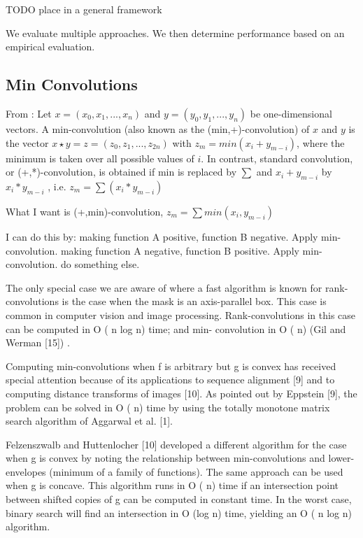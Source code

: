 TODO place in a general framework

We evaluate multiple approaches. We then determine performance based on an
empirical evaluation.

\subsection{Min Convolutions}
From \cite{burcsi2010table}:
Let $x = (x_0, x_1, ..., x_n)$ and $y = (y_0, y_1, ..., y_n)$ be one-dimensional
vectors.
A min-convolution (also known as the (min,+)-convolution) of $x$ and $y$ is the
vector $x \star y = z = (z_0, z_1, ...,z_{2n})$
with $z_m = min(x_i + y_{m-i})$, where the minimum is taken over all possible
values of $i$. 
In contrast, standard convolution, or (+,*)-convolution, is obtained if min is replaced by $\sum$ and
$x_i + y_{m-i}$ by $x_i * y_{m-i}$ , i.e. 
$z_m = \sum(x_i * y_{m-i})$

What I want is (+,min)-convolution, $z_m = \sum min(x_i , y_{m-i})$

I can do this by:
making function A positive, function B negative.
Apply min-convolution.
making function A negative, function B positive.
Apply min-convolution.
do something else.


The only special case we are aware of where a fast algorithm is known for
rank-convolutions is the case when the mask is an axis-parallel box. This case
is common in computer vision and image processing. Rank-convolutions in this
case can be computed in O ( n log n) time; and min- convolution in O ( n) (Gil
and Werman [15]) \cite{babai2009computing}.

Computing min-convolutions when f is arbitrary but g is convex has received
special attention because of its applications to sequence alignment [9] and to
computing distance transforms of images [10]. As pointed out by Eppstein [9],
the problem can be solved in O ( n) time by using the totally monotone matrix
search algorithm of Aggarwal et al. [1].
\cite{babai2009computing}

Felzenszwalb and Huttenlocher [10] developed a different algorithm for the case
when g is convex by noting the relationship between min-convolutions and
lower-envelopes (minimum of a family of functions). The same approach can be
used when g is concave. This algorithm runs in O ( n) time if an intersection
point between shifted copies of g can be computed in constant time. In the worst
case, binary search will find an intersection in O (log n) time, yielding an O (
n log n) algorithm.
\cite{babai2009computing}

